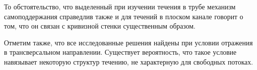 То обстоятельство, что выделенный при изучении течения в трубе механизм самоподдержания справедлив также и для течений в плоском канале говорит о том, что он связан с кривизной стенки существенным образом. 

Отметим также, что все исследованные решения найдены при условии отражения в трансверсальном направлении. Существует вероятность, что такое условие навязывает некоторую структур течению, не характерную для свободных потоках. 






